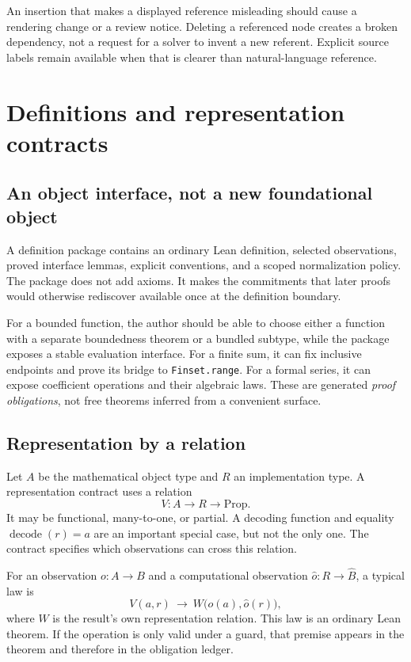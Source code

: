 \documentclass[11pt,a4paper]{article}
\newcommand{\code}[1]{\nolinkurl{#1}}
\theoremstyle{definition}
\begin{document}
An insertion that makes a displayed reference misleading should cause a rendering
change or a review notice. Deleting a referenced node creates a broken dependency,
not a request for a solver to invent a new referent. Explicit source labels remain
available when that is clearer than natural-language reference.

\section{Definitions and representation contracts}
\label{sec:representations}
\subsection{An object interface, not a new foundational object}
A definition package contains an ordinary Lean definition, selected observations,
proved interface lemmas, explicit conventions, and a scoped normalization policy.
The package does not add axioms. It makes the commitments that later proofs would
otherwise rediscover available once at the definition boundary.

For a bounded function, the author should be able to choose either a function
with a separate boundedness theorem or a bundled subtype, while the package
exposes a stable evaluation interface. For a finite sum, it can fix inclusive
endpoints and prove its bridge to \code{Finset.range}. For a formal series, it
can expose coefficient operations and their algebraic laws. These are generated
\emph{proof obligations}, not free theorems inferred from a convenient surface.

\subsection{Representation by a relation}
Let $A$ be the mathematical object type and $R$ an implementation type.
A representation contract uses a relation
\[
 V:A\to R\to\mathrm{Prop}.
\]
It may be functional, many-to-one, or partial. A decoding function and equality
$\operatorname{decode}(r)=a$ are an important special case, but not the only one.
The contract specifies which observations can cross this relation.

For an observation $o:A\to B$ and a computational observation
$\widehat o:R\to \widehat B$, a typical law is
\begin{equation}
 V(a,r)\ \longrightarrow\
 W\bigl(o(a),\widehat o(r)\bigr),
 \label{eq:observation}
\end{equation}
where $W$ is the result's own representation relation. This law is an ordinary
Lean theorem. If the operation is only valid under a guard, that premise appears
in the theorem and therefore in the obligation ledger.
\end{document}
